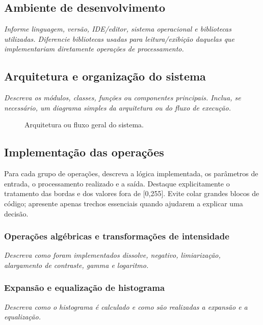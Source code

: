 \documentclass[11pt,a4paper]{article}
\newcommand{\placeholder}[1]{\textcolor{muted}{\textit{#1}}}
\begin{document}
\subsection{Ambiente de desenvolvimento}
\placeholder{Informe linguagem, versão, IDE/editor, sistema operacional e bibliotecas utilizadas. Diferencie bibliotecas usadas para leitura/exibição daquelas que implementariam diretamente operações de processamento.}

\subsection{Arquitetura e organização do sistema}
\placeholder{Descreva os módulos, classes, funções ou componentes principais. Inclua, se necessário, um diagrama simples da arquitetura ou do fluxo de execução.}

\begin{figure}[H]
\centering
{}
\caption{Arquitetura ou fluxo geral do sistema.}
\label{fig:arquitetura}
\end{figure}

\subsection{Implementação das operações}

\begin{orientacao}
Para cada grupo de operações, descreva a lógica implementada, os parâmetros de entrada, o processamento realizado e a saída. Destaque explicitamente o tratamento das bordas e dos valores fora de [0,255]. Evite colar grandes blocos de código; apresente apenas trechos essenciais quando ajudarem a explicar uma decisão.
\end{orientacao}

\subsubsection{Operações algébricas e transformações de intensidade}
\placeholder{Descreva como foram implementados dissolve, negativo, limiarização, alargamento de contraste, gamma e logaritmo.}

\subsubsection{Expansão e equalização de histograma}
\placeholder{Descreva como o histograma é calculado e como são realizadas a expansão e a equalização.}
\end{document}
